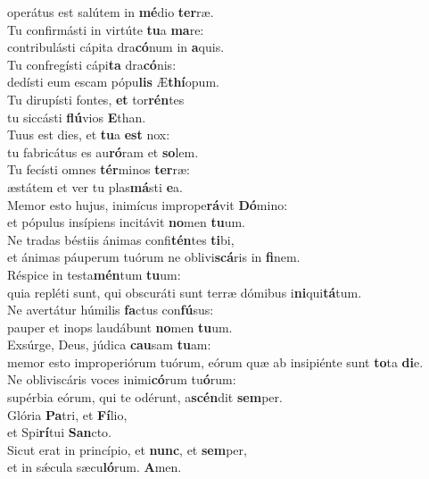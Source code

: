 \oddverse operátus est salútem in \textbf{mé}dio \textbf{ter}ræ.\\
\evenverse Tu confirmásti in virtúte \textbf{tu}a \textbf{ma}re:~\*\\
\evenverse contribulásti cápita dra\textbf{có}num in \textbf{a}quis.\\
\oddverse Tu confregísti cápi\textbf{ta} dra\textbf{có}nis:~\*\\
\oddverse dedísti eum escam pópu\textbf{lis} Æ\textbf{thí}opum.\\
\evenverse Tu dirupísti fontes, \textbf{et} tor\textbf{rén}tes~\*\\
\evenverse tu siccásti \textbf{flú}vios \textbf{E}than.\\
\oddverse Tuus est dies, et \textbf{tu}a \textbf{est} nox:~\*\\
\oddverse tu fabricátus es au\textbf{ró}ram et \textbf{so}lem.\\
\evenverse Tu fecísti omnes \textbf{tér}minos \textbf{ter}ræ:~\*\\
\evenverse æstátem et ver tu plas\textbf{má}sti \textbf{e}a.\\
\oddverse Memor esto hujus, inimícus imprope\textbf{rá}vit \textbf{Dó}mino:~\*\\
\oddverse et pópulus insípiens incitávit \textbf{no}men \textbf{tu}um.\\
\evenverse Ne tradas béstiis ánimas confi\textbf{tén}tes \textbf{ti}bi,~\*\\
\evenverse et ánimas páuperum tuórum ne oblivi\textbf{scá}ris in \textbf{fi}nem.\\
\oddverse Réspice in testa\textbf{mén}tum \textbf{tu}um:~\*\\
\oddverse quia repléti sunt, qui obscuráti sunt terræ dómibus i\textbf{ni}qui\textbf{tá}tum.\\
\evenverse Ne avertátur húmilis \textbf{fa}ctus con\textbf{fú}sus:~\*\\
\evenverse pauper et inops laudábunt \textbf{no}men \textbf{tu}um.\\
\oddverse Exsúrge, Deus, júdica \textbf{cau}sam \textbf{tu}am:~\*\\
\oddverse memor esto improperiórum tuórum, eórum quæ ab insipiénte sunt \textbf{to}ta \textbf{di}e.\\
\evenverse Ne obliviscáris voces inimi\textbf{có}rum tu\textbf{ó}rum:~\*\\
\evenverse supérbia eórum, qui te odérunt, a\textbf{scén}dit \textbf{sem}per.\\
\oddverse Glória \textbf{Pa}tri, et \textbf{Fí}lio,~\*\\
\oddverse et Spi\textbf{rí}tui \textbf{San}cto.\\
\evenverse Sicut erat in princípio, et \textbf{nunc}, et \textbf{sem}per,~\*\\
\evenverse et in sǽcula sæcu\textbf{ló}rum. \textbf{A}men.\\
